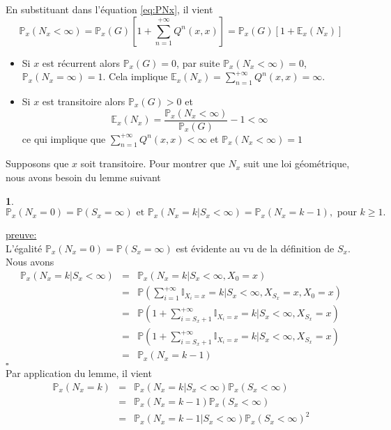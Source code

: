 \documentclass[8pt,notheorems]{beamer}
\newtheorem{lemma}{\translate{Lemme}}
\theoremstyle{definition}
\theoremstyle{example}
\theoremstyle{mystyle}
\theoremstyle{plain}
\begin{document}
\begin{frame}[allowframebreaks]
En substituant dans l'équation \eqref{eq:PNx}, il vient
\begin{equation*}
\mathbb{P}_{x}(N_x<\infty)=\mathbb{P}_{x}(G)\left[1+\sum_{n=1}^{+\infty}Q^{n}(x,x)\right]=\mathbb{P}_{x}(G)\left[1+\mathbb{E}_x(N_x)\right]
\end{equation*}
\begin{itemize}
\item Si $x$ est récurrent alors $\mathbb{P}_{x}(G)=0$, par suite $\mathbb{P}_{x}(N_x<\infty)=0$, $\mathbb{P}_{x}(N_x=\infty)=1$. Cela implique $\mathbb{E}_x(N_x)=\sum_{n=1}^{+\infty}Q^{n}(x,x)=\infty$. \\
\item Si $x$ est transitoire alors $\mathbb{P}_{x}(G)>0$ et
$$
\mathbb{E}_x(N_x)=\frac{\mathbb{P}_{x}(N_x<\infty)}{\mathbb{P}_{x}(G)}-1<\infty
$$
ce qui implique que $\sum_{n=1}^{+\infty}Q^{n}(x,x)<\infty$ et $\mathbb{P}_{x}(N_x<\infty)=1$
\end{itemize}
Supposons que $x$ soit transitoire. Pour montrer que $N_x$ suit une loi géométrique, nous avons besoin du lemme suivant
\begin{lemma}
$$
\mathbb{P}_x(N_x=0)=\mathbb{P}(S_x=\infty)\text{ et }\mathbb{P}_x(N_x=k|S_x<\infty)=\mathbb{P}_x(N_x=k-1), \text{ pour }k\geq1.
$$
\end{lemma}
\underline{preuve:}\\
L'égalité $\mathbb{P}_x(N_x=0)=\mathbb{P}(S_x=\infty)$ est évidente au vu de la définition de $S_x$. Nous avons
\begin{eqnarray*}
\mathbb{P}_x(N_x=k|S_x<\infty)&=&\mathbb{P}_x(N_x=k|S_x<\infty,X_0=x)\\
&=&\mathbb{P}\left(\sum_{i=1}^{+\infty}\mathbb{I}_{X_i = x}=k\big\rvert S_x<\infty,X_{S_x}=x,X_0=x\right)\\
&=&\mathbb{P}\left(1+\sum_{i=S_x+1}^{+\infty}\mathbb{I}_{X_i = x}=k\big \rvert S_x<\infty,X_{S_x}=x\right)\\
&=&\mathbb{P}\left(1+\sum_{i=S_x+1}^{+\infty}\mathbb{I}_{X_i = x}=k\big\rvert S_x<\infty,X_{S_x}=x\right)\\
&=&\mathbb{P}_x(N_x=k-1)
\end{eqnarray*}
$\square$\\
Par application du lemme, il vient
\begin{eqnarray*}
\mathbb{P}_x(N_x=k)&=&\mathbb{P}_x(N_x=k|S_x<\infty)\mathbb{P}_x(S_x<\infty)\\
&=&\mathbb{P}_x(N_x=k-1)\mathbb{P}_x(S_x<\infty)\\
&=&\mathbb{P}_x(N_x=k-1|S_x<\infty)\mathbb{P}_x(S_x<\infty)^{2}\\

\end{eqnarray*}
\end{frame}
\end{document}
